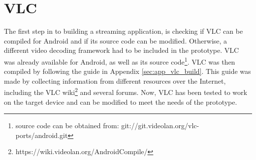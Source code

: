 \chapter{VLC}
\thispagestyle{fancy}
The first step in to building a streaming application, is checking if VLC can be compiled for Android and if its source code can be modified. Otherwise, a different video decoding framework had to be included in the prototype. VLC was already available for Android, as well as its source code\footnote{source code can be obtained from: git://git.videolan.org/vlc-ports/android.git}. VLC was then compiled by following the guide in Appendix \ref{sec:app_vlc_build}. This guide was made by collecting information from different resources over the Internet, including the VLC wiki\footnote{https://wiki.videolan.org/AndroidCompile/} and several forums. Now, VLC has been tested to work on the target device and can be modified to meet the needs of the prototype.